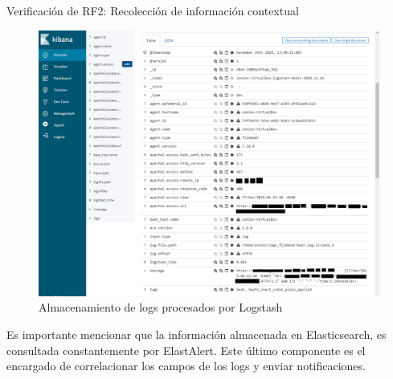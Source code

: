 \begin{section}{Verificación de RF2: Recolección de información contextual}
\begin{figure}[H]
    \includegraphics[width=1\textwidth]{./iteracion_2_imagenes/kibana_logs_parseados_2EDITADO.png}
    \caption{Almacenamiento de logs procesados por Logstash}
    \label{fig:iter2_logs_filtrados}
    \end{figure}
    \FloatBarrier
    Es importante mencionar que la información almacenada en Elasticsearch, es consultada constantemente por ElastAlert. Este último componente es el encargado de correlacionar los campos de los logs y enviar notificaciones.
    \end{section}
    \pagebreak
    
